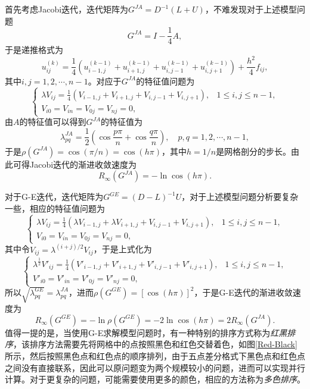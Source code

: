 \documentclass[a4paper,10pt]{ctexart}
\begin{document}
首先考虑Jacobi迭代，迭代矩阵为$ G^{JA} = D^{-1}(L+U) $，不难发现对于上述模型问题
\[
    G^{JA} = I - \frac{1}{4}A,
\]
于是递推格式为
\[
    u_{ij}^{(k)} = \frac{1}{4}(u_{i-1,j}^{(k-1)} + u_{i+1,j}^{(k-1)} + u_{i,j-1}^{(k-1)} + u_{i,j+1}^{(k-1)}) + \frac{h^2}{4} f_{ij},
\]
其中$ i,j=1,2,\cdots ,n-1 $。对应于$ G^{JA} $的特征值问题为
\[
    \begin{cases}
        \lambda V_{ij} = \frac{1}{4} (V_{i-1,j} + V_{i+1,j} + V_{i,j-1} + V_{i,j+1}), & 1\leqslant i,j\leqslant n-1,\\
        V_{i0} = V_{in} = V_{0j} = V_{nj} = 0,
    \end{cases}
\]
由$ A $的特征值可以得到$ G^{JA} $的特征值为
\[
    \lambda^{JA}_{pq} = \frac{1}{2}(\cos \frac{p \pi}{n} + \cos \frac{q \pi}{n}),\quad p,q = 1,2,\cdots ,n-1,
\]
于是$ \rho(G^{JA}) = \cos(\pi / n) = \cos(h \pi) $，其中$ h = 1 / n $是网格剖分的步长。由此可得Jacobi迭代的渐进收敛速度为
\[
    R_\infty(G^{JA}) = - \ln \cos(h \pi).
\]

对于G-E迭代，迭代矩阵为$ G^{GE} = (D-L)^{-1}U $，对于上述模型问题分析要复杂一些，相应的特征值问题为
\[
    \begin{cases}
        \lambda V_{ij} = \frac{1}{4} (\lambda V_{i-1,j} + \lambda V_{i+1,j} + V_{i,j-1} + V_{i,j+1}), & 1\leqslant i,j\leqslant n-1,\\
        V_{i0} = V_{in} = V_{0j} = V_{nj} = 0,
    \end{cases}
\]
其中令$ V_{ij} = \lambda^{(i+j) / 2}V_{ij} $，于是上式化为
\[
    \begin{cases}
        \lambda^{\frac{1}{2}} V'_{ij} = \frac{1}{4} (V'_{i-1,j} + V'_{i+1,j} + V'_{i,j-1} + V'_{i,j+1}), & 1\leqslant i,j\leqslant n-1,\\
        V'_{i0} = V'_{in} = V'_{0j} = V'_{nj} = 0,
    \end{cases}
\]
所以$ \sqrt{\lambda^{GE}_{pq}} = \lambda^{JA}_{pq} $，进而$ \rho(G^{GE}) = [\cos(h \pi)]^2 $，于是G-E迭代的渐进收敛速度为
\[
    R_\infty(G^{GE}) = -\ln\rho(G^{GE}) = -2\ln \cos(h \pi) = 2R_\infty(G^{JA}).
\] 
值得一提的是，当使用G-E求解模型问题时，有一种特别的排序方式称为\emph{红黑排序}，该排序方法需要先将网格中的点按照黑色和红色交替着色，如图\ref{Red-Black}所示，然后按照黑色点和红色点的顺序排列，由于五点差分格式下黑色点和红色点之间没有直接联系，因此可以原问题变为两个规模较小的问题，进而可以实现并行计算。对于更复杂的问题，可能需要使用更多的颜色，相应的方法称为\emph{多色排序}。
\end{document}
